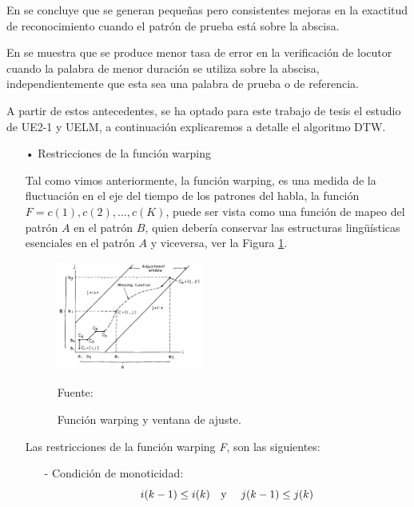 \begin{enumerate}
En \citep{rabiner3} se concluye que se generan pequeñas pero consistentes mejoras en la exactitud de reconocimiento cuando el patrón de prueba está sobre la abscisa.

\vskip 0.5cm
En \citep{furui} se muestra que se produce menor tasa de error en la verificación de locutor cuando la palabra de menor duración se utiliza sobre la abscisa, independientemente que esta sea una palabra de prueba o de referencia.

\vskip 0.5cm
A partir de estos antecedentes, se ha optado para este trabajo de tesis el estudio de UE2-1 y UELM, a continuación explicaremos a detalle el algoritmo DTW.

\begin{enumerate}
\item[•]Restricciones de la función warping
\par
Tal como vimos anteriormente, la función warping, es una medida de la fluctuación en el eje del tiempo de los patrones del habla, la función $F = c(1), c(2),..., c(K)$, puede ser vista como una función de mapeo del patrón $A$ en el patrón $B$, quien debería conservar las estructuras lingüísticas esenciales en el patrón $A$ y viceversa, ver la Figura \ref{fig:figura2.52}.
\begin{figure}[H]
\begin{center}
\includegraphics[width=0.45\textwidth]{Imagenes/Cap2/image053}
\end{center}
\begin{center}
\vskip -0.5cm
\caption{\small{Función warping y ventana de ajuste.}}
\label{fig:figura2.52}
{\small{Fuente: \cite{sakoe}}}
\end{center}
\end{figure}

Las restricciones de la función warping \textit{F}, son las siguientes:
\begin{enumerate}
\item[-]Condición de monoticidad:
\begin{equation}
\label{eq:ecuacion80}
i(k - 1) \leq i(k)
\text{\quad y \quad}
j(k - 1) \leq j(k)
\end{equation}


\end{enumerate}
\end{enumerate}
\end{enumerate}
